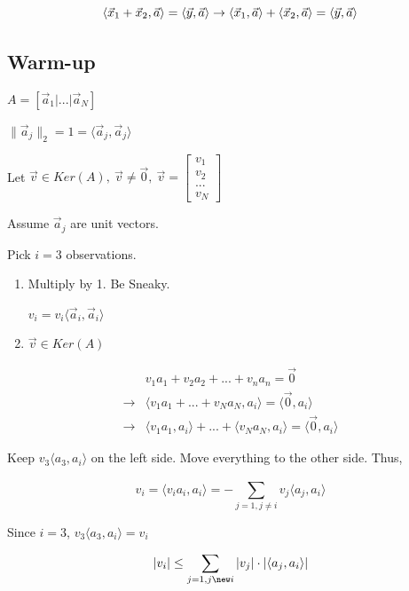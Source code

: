 \documentclass[11pt]{article}
\begin{document}
$$
\langle \vec x_1 + \vec x_2, \vec a \rangle = \langle \vec y, \vec a \rangle
\to\\
\langle \vec x_1, \vec a \rangle + \langle \vec x_2, \vec a \rangle = \langle
\vec y, \vec a \rangle
$$

\subsection{Warm-up}
\label{sec:orgc2a503c}

\(A = [\vec a_1 | ... | \vec a_N]\)

\(\| \vec a_j \|_2 = 1 = \langle \vec a_j, \vec a_j \rangle\)


Let \(\vec v \in Ker(A), \ \vec{v} \neq \vec 0, \ \vec v = \begin{bmatrix} v_1 \\ v_2 \\ ... \\ v_N \end{bmatrix}\)

Assume \(\vec a_j\) are unit vectors.

Pick \(i = 3\) observations.

\begin{enumerate}
\item Multiply by 1. Be Sneaky.

\(v_i = v_i \langle \vec a_i, \vec a_i \rangle\)

\item \(\vec v \in Ker(A)\)
\end{enumerate}

\begin{equation}
\begin{split}
& v_1 a_1 + v_2 a_2 + ... + v_n a_n = \vec 0\\
\to & \langle v_1 a_1 + ... + v_N a_N, a_i \rangle = \langle \vec 0, a_i \rangle\\
\to & \langle v_1 a_1, a_i \rangle + ... + \langle v_N a_N, a_i \rangle = \langle \vec 0, a_i \rangle
\end{split}
\end{equation}

Keep \(v_3 \langle a_3, a_i \rangle\) on the left side. Move everything to the
other side. Thus,

$$
v_i = \langle v_i a_i, a_i \rangle = - \sum_{j = 1, j \neq i}^{} v_j \langle a_j, a_i \rangle
$$

Since \(i = 3\), \(v_3 \langle a_3, a_i \rangle = v_i\)

$$| v_i | \leq \sum_{j = 1, j \new i} | v_j | \cdot | \langle a_j, a_i \rangle |$$
\end{document}
